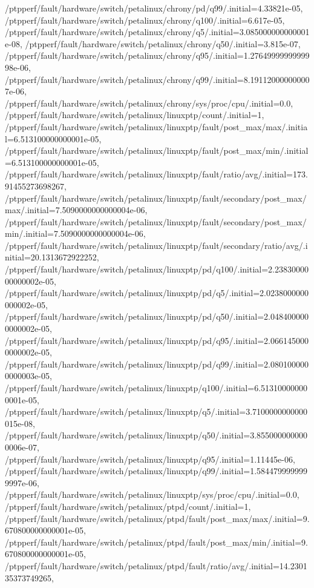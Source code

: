{    /ptpperf/fault/hardware/switch/petalinux/chrony/pd/q99/.initial=4.33821e-05,
    /ptpperf/fault/hardware/switch/petalinux/chrony/q100/.initial=6.617e-05,
    /ptpperf/fault/hardware/switch/petalinux/chrony/q5/.initial=3.085000000000001e-08,
    /ptpperf/fault/hardware/switch/petalinux/chrony/q50/.initial=3.815e-07,
    /ptpperf/fault/hardware/switch/petalinux/chrony/q95/.initial=1.2764999999999998e-06,
    /ptpperf/fault/hardware/switch/petalinux/chrony/q99/.initial=8.191120000000007e-06,
    /ptpperf/fault/hardware/switch/petalinux/chrony/sys/proc/cpu/.initial=0.0,
    /ptpperf/fault/hardware/switch/petalinux/linuxptp/count/.initial=1,
    /ptpperf/fault/hardware/switch/petalinux/linuxptp/fault/post_max/max/.initial=6.513100000000001e-05,
    /ptpperf/fault/hardware/switch/petalinux/linuxptp/fault/post_max/min/.initial=6.513100000000001e-05,
    /ptpperf/fault/hardware/switch/petalinux/linuxptp/fault/ratio/avg/.initial=173.91455273698267,
    /ptpperf/fault/hardware/switch/petalinux/linuxptp/fault/secondary/post_max/max/.initial=7.5090000000000004e-06,
    /ptpperf/fault/hardware/switch/petalinux/linuxptp/fault/secondary/post_max/min/.initial=7.5090000000000004e-06,
    /ptpperf/fault/hardware/switch/petalinux/linuxptp/fault/secondary/ratio/avg/.initial=20.1313672922252,
    /ptpperf/fault/hardware/switch/petalinux/linuxptp/pd/q100/.initial=2.2383000000000002e-05,
    /ptpperf/fault/hardware/switch/petalinux/linuxptp/pd/q5/.initial=2.0238000000000002e-05,
    /ptpperf/fault/hardware/switch/petalinux/linuxptp/pd/q50/.initial=2.0484000000000002e-05,
    /ptpperf/fault/hardware/switch/petalinux/linuxptp/pd/q95/.initial=2.0661450000000002e-05,
    /ptpperf/fault/hardware/switch/petalinux/linuxptp/pd/q99/.initial=2.0801000000000003e-05,
    /ptpperf/fault/hardware/switch/petalinux/linuxptp/q100/.initial=6.513100000000001e-05,
    /ptpperf/fault/hardware/switch/petalinux/linuxptp/q5/.initial=3.7100000000000015e-08,
    /ptpperf/fault/hardware/switch/petalinux/linuxptp/q50/.initial=3.8550000000000006e-07,
    /ptpperf/fault/hardware/switch/petalinux/linuxptp/q95/.initial=1.11445e-06,
    /ptpperf/fault/hardware/switch/petalinux/linuxptp/q99/.initial=1.5844799999999997e-06,
    /ptpperf/fault/hardware/switch/petalinux/linuxptp/sys/proc/cpu/.initial=0.0,
    /ptpperf/fault/hardware/switch/petalinux/ptpd/count/.initial=1,
    /ptpperf/fault/hardware/switch/petalinux/ptpd/fault/post_max/max/.initial=9.670800000000001e-05,
    /ptpperf/fault/hardware/switch/petalinux/ptpd/fault/post_max/min/.initial=9.670800000000001e-05,
    /ptpperf/fault/hardware/switch/petalinux/ptpd/fault/ratio/avg/.initial=14.230135373749265,
}
